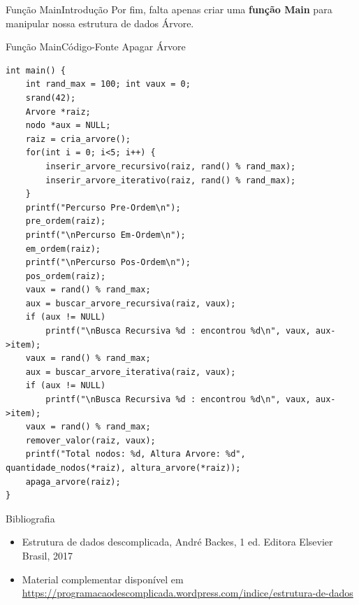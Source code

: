\documentclass[aspectratio=169]{beamer}
\begin{document}
\begin{frame}{Função Main}{Introdução}
Por fim, falta apenas criar uma {\bf função Main} para manipular nossa estrutura de dados Árvore.
\end{frame}


\begin{frame}[fragile]{Função Main}{Código-Fonte Apagar Árvore}
\begin{lstlisting}[style=CStyle,basicstyle=\tiny]
int main() {
    int rand_max = 100; int vaux = 0;
    srand(42);
    Arvore *raiz;
    nodo *aux = NULL;
    raiz = cria_arvore();
    for(int i = 0; i<5; i++) {
        inserir_arvore_recursivo(raiz, rand() % rand_max);
        inserir_arvore_iterativo(raiz, rand() % rand_max);
    }
    printf("Percurso Pre-Ordem\n");
    pre_ordem(raiz);
    printf("\nPercurso Em-Ordem\n");
    em_ordem(raiz);
    printf("\nPercurso Pos-Ordem\n");
    pos_ordem(raiz);
    vaux = rand() % rand_max;
    aux = buscar_arvore_recursiva(raiz, vaux);
    if (aux != NULL)
        printf("\nBusca Recursiva %d : encontrou %d\n", vaux, aux->item);
    vaux = rand() % rand_max;
    aux = buscar_arvore_iterativa(raiz, vaux);
    if (aux != NULL)
        printf("\nBusca Recursiva %d : encontrou %d\n", vaux, aux->item);
    vaux = rand() % rand_max;
    remover_valor(raiz, vaux);
    printf("Total nodos: %d, Altura Arvore: %d", quantidade_nodos(*raiz), altura_arvore(*raiz));
    apaga_arvore(raiz);
}
\end{lstlisting}  
\end{frame}

%




\begin{frame}{Bibliografia}
\begin{itemize}
\item Estrutura de dados descomplicada, André Backes, 1 ed. Editora	Elsevier Brasil, 2017 
\item Material complementar disponível em \url{https://programacaodescomplicada.wordpress.com/indice/estrutura-de-dados}
\end{itemize}
\end{frame}


\begin{frame}[plain]
  \titlepage
\end{frame}
\end{document}
